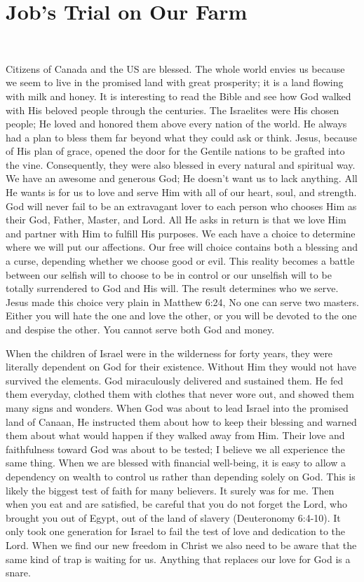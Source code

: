 \documentclass[oneside]{book}
\begin{document}
\chapter{Job's Trial on Our Farm}
\

Citizens of Canada and the US are blessed. The whole world envies us because we seem to live in the promised land with great prosperity; it is a land flowing with milk and honey. It is  interesting to read the Bible and see how God walked with His beloved people through the centuries. The Israelites were His chosen people; He loved and honored them above every nation of the world. He always had a plan to bless them far beyond what they could ask or think. Jesus, because of His plan of grace, opened the door for the Gentile nations to be grafted into the vine. Consequently, they were also blessed in every natural and spiritual way. We have an awesome and generous God; He doesn’t want us to lack anything. All He wants is for us to love and serve Him with all of our heart, soul, and strength. God will never fail to be an extravagant lover to each person who chooses Him as their God, Father, Master, and Lord. All He asks in return is that we love Him and partner with Him to fulfill His purposes. We each have a choice to determine where we will put our affections. Our free will choice contains both a blessing and a curse, depending whether we choose good or evil. This reality becomes a battle between our selfish will to choose to be in control or our unselfish will to be totally surrendered to God and His will. The result determines who we serve. Jesus made this choice very plain in Matthew 6:24, No one can serve two masters. Either you will hate the one and love the other, or you will be devoted to the one and despise the other. You cannot serve both God and money. 

When the children of Israel were in the wilderness for forty years, they were literally dependent on God for their existence. Without Him they would not have survived the elements. God miraculously delivered and sustained them. He fed them everyday, clothed them with clothes that never wore out, and showed them many signs and wonders. When God was about to lead Israel into the promised land of Canaan, He instructed them about how to keep their blessing and warned them about what would happen if they walked away from Him. Their love and faithfulness toward God was about to be tested; I believe we all experience the same thing. When we are blessed with financial well-being, it is easy to allow a dependency on wealth to control us rather than depending solely on God. This is likely the biggest test of faith for many believers. It surely was for me. Then when you eat and are satisfied, be careful that you do not forget the Lord, who brought you out of Egypt, out of the land of slavery (Deuteronomy 6:4-10). It only took one generation for Israel to fail the test of love and dedication to the Lord. When we find our new freedom in Christ we also need to be aware that the same kind of trap is waiting for us. Anything that replaces our love for God is a snare. 
\end{document}
